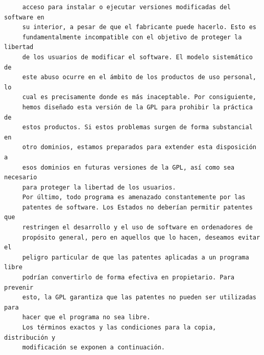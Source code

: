 \begin{verbatim}
     acceso para instalar o ejecutar versiones modificadas del software en
     su interior, a pesar de que el fabricante puede hacerlo. Esto es
     fundamentalmente incompatible con el objetivo de proteger la libertad
     de los usuarios de modificar el software. El modelo sistemático de
     este abuso ocurre en el ámbito de los productos de uso personal, lo
     cual es precisamente donde es más inaceptable. Por consiguiente,
     hemos diseñado esta versión de la GPL para prohibir la práctica de
     estos productos. Si estos problemas surgen de forma substancial en
     otro dominios, estamos preparados para extender esta disposición a
     esos dominios en futuras versiones de la GPL, así como sea necesario
     para proteger la libertad de los usuarios.
     Por último, todo programa es amenazado constantemente por las
     patentes de software. Los Estados no deberían permitir patentes que
     restringen el desarrollo y el uso de software en ordenadores de
     propósito general, pero en aquellos que lo hacen, deseamos evitar el
     peligro particular de que las patentes aplicadas a un programa libre
     podrían convertirlo de forma efectiva en propietario. Para prevenir
     esto, la GPL garantiza que las patentes no pueden ser utilizadas para
     hacer que el programa no sea libre.
     Los términos exactos y las condiciones para la copia, distribución y
     modificación se exponen a continuación.


\end{verbatim}
